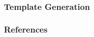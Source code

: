 \documentclass{beamer}
\begin{document}
\renewcommand*\selectTemplateGeneration{orange}
\renewcommand*\selectTemplateGeneration{}

\begin{frame}
  \frametitle{Template Generation}
\end{frame}

\renewcommand*\selectTemplateOptimization{orange}
\renewcommand*\selectTemplateOptimization{}

\begin{frame}
  \frametitle{References}
  
  
\end{frame}
\end{document}
